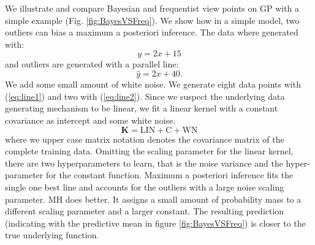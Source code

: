 We illustrate and compare Bayesian and frequentist view points on GP with a simple example (Fig. \ref{fig:BayesVSFreq}). We show how in a simple model, two outliers can bias a maximum a posteriori inference. The data where generated with:
\begin{equation}
\label{eq:line1}
y = 2x + 15
\end{equation}
and outliers are generated with a parallel line:
\begin{equation}
\label{eq:line2}
\hat{y} = 2x + 40.
\end{equation}
We add some small amount of white noise. We generate eight data points with (\ref{eq:line1}) and two with (\ref{eq:line2}). Since we suspect the underlying data generating mechanism to be linear, we fit a linear kernel with a constant covariance as intercept and some white noise.
\begin{equation}
\mathbf{K} = \text{LIN} + \text{C} + \text{WN}
\end{equation}
where we upper case matrix notation denotes the covariance matrix of the complete training data. Omitting the scaling parameter for the linear kernel, there are two hyperparameters to learn, that is the noise variance and the hyper-parameter for the constant function. Maximum a posteriori inference fits the single one best line and accounts for the outliers with a large noise scaling parameter. MH does better. It assigns a small amount of probability mass to a different scaling parameter and a larger constant. The resulting prediction (indicating with the predictive mean in figure \ref{fig:BayesVSFreq}) is closer to the true underlying function.   

